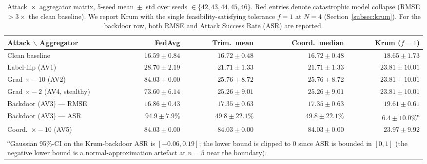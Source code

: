 \documentclass[preprint,12pt,authoryear]{elsarticle}
\begin{document}
\begin{table}[!ht]
\centering
\footnotesize
\setlength{\tabcolsep}{4pt}
\renewcommand{\arraystretch}{1.25}
\caption{Attack~$\times$~aggregator matrix, 5-seed mean~$\pm$~std
over seeds $\in \{42, 43, 44, 45, 46\}$. Red entries denote
catastrophic model collapse (RMSE $> 3\times$ the clean baseline).
We report Krum with the single feasibility-satisfying tolerance
$f = 1$ at $N = 4$ (Section~\ref{subsec:krum}). For the backdoor
row, both RMSE and Attack Success Rate (ASR) are reported.}
\label{tab:matrix}
\begin{tabular}{@{}l r r r r@{}}
\toprule
Attack $\backslash$ Aggregator & FedAvg & Trim.\ mean & Coord.\ median & Krum ($f{=}1$) \\
\midrule
Clean baseline                     & $16.59 \pm 0.84$          & $16.72 \pm 0.48$          & $16.72 \pm 0.48$          & $18.65 \pm 1.73$          \\
Label-flip (AV1)                   & $28.70 \pm 2.19$          & $21.71 \pm 1.33$          & $21.71 \pm 1.33$          & $23.81 \pm 10.01$         \\
Grad $\times{-}10$ (AV2)           & \textcolor{red!75!black}{$84.03 \pm 0.00$} & $25.76 \pm 8.72$      & $25.76 \pm 8.72$          & $23.81 \pm 10.01$         \\
Grad $\times{-}2$ (AV4, stealthy)  & \textcolor{red!75!black}{$73.60 \pm 6.14$} & $25.26 \pm 9.01$      & $25.26 \pm 9.01$          & $23.81 \pm 10.01$         \\
\midrule
Backdoor (AV3) --- RMSE            & $16.86 \pm 0.43$          & $17.35 \pm 0.63$          & $17.35 \pm 0.63$          & $19.61 \pm 0.61$          \\
Backdoor (AV3) --- ASR             & \textbf{$94.9 \pm 7.9\%$} & $49.8 \pm 22.1\%$         & $49.8 \pm 22.1\%$         & \textbf{$6.4 \pm 10.0\%$}\textsuperscript{a} \\
\midrule
Coord.\ $\times{-}10$ (AV5)        & \textcolor{red!75!black}{$84.03 \pm 0.00$} & \textcolor{red!75!black}{$84.03 \pm 0.00$} & \textcolor{red!75!black}{$84.03 \pm 0.00$} & \textbf{$23.97 \pm 9.92$} \\
\bottomrule
\multicolumn{5}{p{.98\linewidth}}{\footnotesize\textsuperscript{a}Gaussian 95\%-CI on the Krum-backdoor ASR is $[-0.06, 0.19]$; the lower bound is clipped to 0 since ASR is bounded in $[0, 1]$ (the negative lower bound is a normal-approximation artefact at $n = 5$ near the boundary).} \\
\end{tabular}
\end{table}
\end{document}
